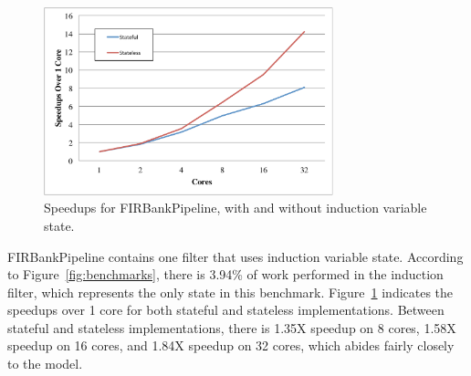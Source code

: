 \begin{figure}[t]
\includegraphics[width=3.3in]{figures/firbank-results.pdf}
\caption{Speedups for FIRBankPipeline, with and without induction variable state.  \protect\label{fig:firbank-results}}
\end{figure}

FIRBankPipeline contains one filter that uses induction variable state.  According to Figure~\ref{fig:benchmarks}, there is 3.94\% of work performed in the induction filter, which represents the only state in this benchmark.  Figure~\ref{fig:firbank-results} indicates the speedups over 1 core for both stateful and stateless implementations.  Between stateful and stateless implementations, there is 1.35X speedup on 8 cores, 1.58X speedup on 16 cores, and 1.84X speedup on 32 cores, which abides fairly closely to the model.